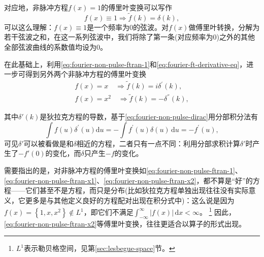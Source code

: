 对应地，非脉冲方程$f(x) =1$的傅里叶变换可以写作
\begin{equation}
  \label{eq:fourier-non-pulse-ftran-1}
  f(x) \equiv 1 \Rightarrow \tilde{f}(k) = \delta(k),
\end{equation}
可以这么理解：$f(x) \equiv 1$是一个频率为$0$的弦波。对$f(x)$做傅里叶转换，分解为若干弦波之和，在这一系列弦波中，我们将除了第一条(对应频率为$0$)之外的其他全部弦波曲线的系数值均设为$0$。

在此基础上，利用\eqref{eq:fourier-non-pulse-ftran-1}和\eqref{eq:fourier-ft-derivative-eq}，进一步可得到另外两个非脉冲方程的傅里叶变换
\begin{align}
  \label{eq:fourier-non-pulse-ftran-x1}
  f(x) = x \quad \Rightarrow \tilde{f}(k) = i \delta^{'}(k), \\
  \label{eq:fourier-non-pulse-ftran-x2}
  f(x) = x^{2} \quad \Rightarrow \tilde{f}(k) = - \delta^{''}(k),
\end{align}

其中$\delta'(k)$是狄拉克方程的导数，基于\eqref{eq:fourier-non-pulse-dirac}用分部积分法有
\begin{equation*}
  \int f(u) \delta^{'}(u) \mathrm{d} u =
  - \int f^{'}(u) \delta(u) \, \mathrm{d} u = - f^{'}(u),
\end{equation*}
可见$\delta'$可以被看做是和$\delta$相近的方程，二者只有一点不同：利用分部求积计算$\delta'$时产生了$- f'(0)$的变化，而$\delta$只产生$-f$的变化。

需要指出的是，对非脉冲方程的傅里叶变换如\eqref{eq:fourier-non-pulse-ftran-1}、\eqref{eq:fourier-non-pulse-ftran-x1}、\eqref{eq:fourier-non-pulse-ftran-x2}，都不算是``好''的方程——它们甚至不是方程，而只是分布(比如狄拉克方程单独出现往往没有实际意义，它更多是与其他定义良好的方程配对出现在积分式中)：这么说是因为$f(x)= \left\{ 1, x, x^{2} \right\} \notin L^{1}$，即它们不满足$\int_{-\infty}^{\infty} \left| f(x) \right| \, \mathrm{d}x < \infty$。
\footnote{$L^{1}$表示勒贝格空间，见第\eqref{sec:lesbegue-space}节。}
因此，\eqref{eq:fourier-non-pulse-ftran-x2}等傅里叶变换，往往更适合以算子的形式出现。

